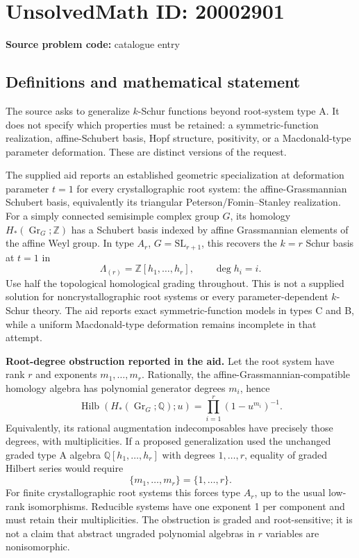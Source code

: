 \documentclass[11pt]{article}
\newcommand{\Z}{\mathbb{Z}}
\newcommand{\Q}{\mathbb{Q}}
\begin{document}
\section*{UnsolvedMath ID: 20002901}
\textbf{Source problem code:} catalogue entry
\subsection{Definitions and mathematical statement}
The source asks to generalize \(k\)-Schur functions beyond root-system type A. It does not specify which properties must be retained: a symmetric-function realization, affine-Schubert basis, Hopf structure, positivity, or a Macdonald-type parameter deformation. These are distinct versions of the request.

The supplied aid reports an established geometric specialization at deformation parameter \(t=1\) for every crystallographic root system: the affine-Grassmannian Schubert basis, equivalently its triangular Peterson/Fomin--Stanley realization. For a simply connected semisimple complex group \(G\), its homology \(H_*(\operatorname{Gr}_G;\Z)\) has a Schubert basis indexed by affine Grassmannian elements of the affine Weyl group. In type \(A_r\), \(G=\mathrm{SL}_{r+1}\), this recovers the \(k=r\) Schur basis at \(t=1\) in
\[
 \Lambda_{(r)}=\Z[h_1,\ldots,h_r],\qquad\deg h_i=i.
\]
Use half the topological homological grading throughout. This is not a supplied solution for noncrystallographic root systems or every parameter-dependent \(k\)-Schur theory. The aid reports exact symmetric-function models in types C and B, while a uniform Macdonald-type deformation remains incomplete in that attempt.

\textbf{Root-degree obstruction reported in the aid.} Let the root system have rank \(r\) and exponents \(m_1,\ldots,m_r\). Rationally, the affine-Grassmannian-compatible homology algebra has polynomial generator degrees \(m_i\), hence
\[
 \operatorname{Hilb}(H_*(\operatorname{Gr}_G;\Q);u)
           =\prod_{i=1}^r(1-u^{m_i})^{-1}.
\]
Equivalently, its rational augmentation indecomposables have precisely those degrees, with multiplicities. If a proposed generalization used the unchanged graded type A algebra \(\Q[h_1,\ldots,h_r]\) with degrees \(1,\ldots,r\), equality of graded Hilbert series would require
\[
 \{m_1,\ldots,m_r\}=\{1,\ldots,r\}.
\]
For finite crystallographic root systems this forces type \(A_r\), up to the usual low-rank isomorphisms. Reducible systems have one exponent 1 per component and must retain their multiplicities. The obstruction is graded and root-sensitive; it is not a claim that abstract ungraded polynomial algebras in \(r\) variables are nonisomorphic.
\end{document}
